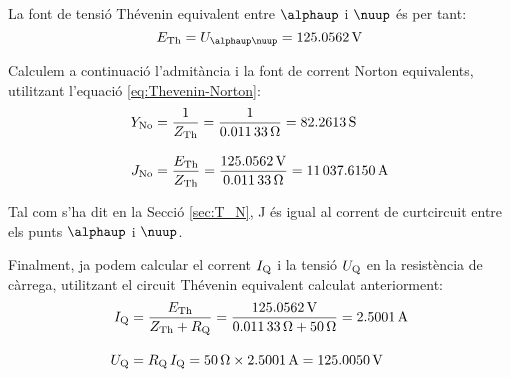 \begin{exemple}
    La font de tensió  Thévenin equivalent entre $\alphaup$ i $\nuup$ és per
    tant:
    \[
    E\ped{Th} = U_{\alphaup\nuup} = \SI{125,0562}{V}
    \]

    Calculem a continuació l'admitància i la font de corrent  Norton equivalents, utilitzant
    l'equació \eqref{eq:Thevenin-Norton}:
    \begin{align*}
        Y_\mathrm{No} &= \frac{1}{Z_\mathrm{Th}} = \frac{1}{\SI{0,01133}{\ohm}} = \SI{82,2613}{S}
        \\[2ex]
        J_\mathrm{No} &= \frac{E_\mathrm{Th}}{Z_\mathrm{Th}} =
        \frac{\SI{125,0562}{V}}{\SI{0,01133}{\ohm}}= \SI{11037,6150}{A}
    \end{align*}

    Tal com s'ha dit en la Secció \ref{sec:T_N}, J és igual al
    corrent de curtcircuit entre els punts $\alphaup$ i $\nuup$.

    Finalment, ja podem calcular el corrent $I_\mathrm{Q}$ i la tensió $U_\mathrm{Q}$ en la
    resistència de càrrega, utilitzant el circuit Thévenin equivalent calculat anteriorment:
    \begin{align*}
        I_\mathrm{Q} &= \frac{E_\mathrm{Th}}{Z_\mathrm{Th} + R_\mathrm{Q}} = \frac{\SI{125,0562}{V}}
        {\SI{0,01133}{\ohm} + \SI{50}{\ohm}} = \SI{2,5001}{A} \\[2ex]
        U_\mathrm{Q} &=  R_\mathrm{Q} \,I_\mathrm{Q} = \SI{50}{\ohm} \times \SI{2,5001}{A} =
        \SI{125,0050}{V}
    \end{align*}
\end{exemple}


